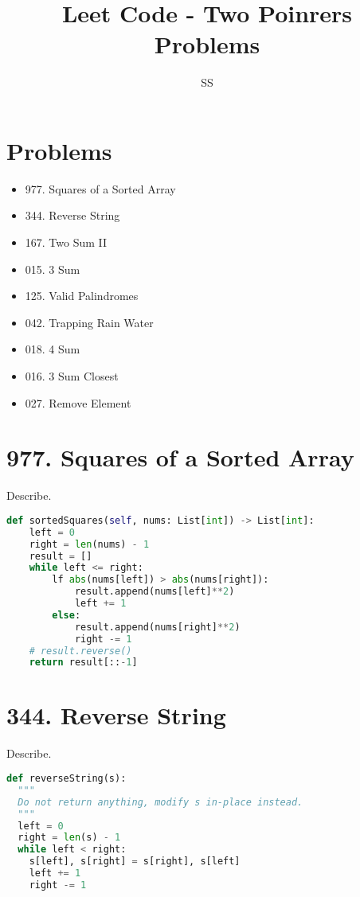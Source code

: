 \documentclass{article}
\title{Leet Code - Two Poinrers Problems}
\author{SS}
\begin{document}
\maketitle

\section{Problems}
\begin{itemize}
    \item 977. Squares of a Sorted Array
    \item 344. Reverse String
    \item 167. Two Sum II
    \item 015. 3 Sum
    \item 125. Valid Palindromes
    \item 042. Trapping Rain Water
    \item 018. 4 Sum
    \item 016. 3 Sum Closest
    \item 027. Remove Element
\end{itemize}
\section{977. Squares of a Sorted Array}
\begin{tcolorbox}[colback=red!5!white, colframe=red!50!black,title=977. Squares of a Sorted Array ] 
Describe.
\end{tcolorbox}
\begin{lstlisting}[language=Python]
def sortedSquares(self, nums: List[int]) -> List[int]:
    left = 0
    right = len(nums) - 1
    result = []
    while left <= right:
        lf abs(nums[left]) > abs(nums[right]):
            result.append(nums[left]**2)
            left += 1
        else:
            result.append(nums[right]**2)
            right -= 1
    # result.reverse()
    return result[::-1]

\end{lstlisting}
\section{344. Reverse String}
\begin{tcolorbox}[colback=red!5!white, colframe=red!50!black,title=344. Reverse String ] 
Describe.
\end{tcolorbox}
\begin{lstlisting}[language=Python]
def reverseString(s):
  """
  Do not return anything, modify s in-place instead.
  """
  left = 0
  right = len(s) - 1
  while left < right:
    s[left], s[right] = s[right], s[left]
    left += 1
    right -= 1
                

\end{lstlisting}
\end{document}
